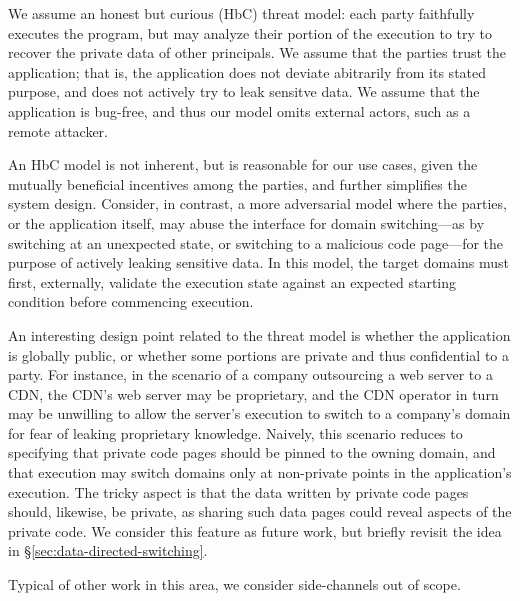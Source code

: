 We assume an honest but curious (HbC) threat model: each party faithfully
executes the program, but may analyze their portion of the execution to try to
recover the private data of other principals.
%
We assume that the parties trust the application; that is, the application does
not deviate abitrarily from its stated purpose, and does not actively try to
leak sensitve data.
%
We assume that the application is bug-free, and thus our model omits external
actors, such as a remote attacker.


An HbC model is not inherent, but is reasonable for our use cases,
given the mutually beneficial incentives among the parties, and further
simplifies the system design.
%
Consider, in contrast, a more adversarial model where the parties, or the
application itself, may abuse the interface for domain switching---as by
switching at an unexpected state, or switching to a malicious code page---for
the purpose of actively leaking sensitive data. 
%
In this model, the target domains must first, externally, validate the
execution state against an expected starting condition before commencing
execution.


An interesting design point related to the threat model is whether the
application is globally public, or whether some portions are private and thus
confidential to a party. 
%
For instance, in the scenario of a company outsourcing a web server to a CDN,
the CDN's web server may be proprietary, and the CDN operator in turn may be
unwilling to allow the server's execution to switch to a company's domain
for fear of leaking proprietary knowledge.
%
Naively, this scenario reduces to specifying that private code pages should be
pinned to the owning domain, and that execution may switch domains only at
non-private points in the application's execution.
%
The tricky aspect is that the data written by private code pages should,
likewise, be private, as sharing such data pages could reveal aspects of
the private code.
%
We consider this feature as future work, but briefly revisit the idea in
\S\ref{sec:data-directed-switching}.


Typical of other work in this area, we consider side-channels out of scope.
